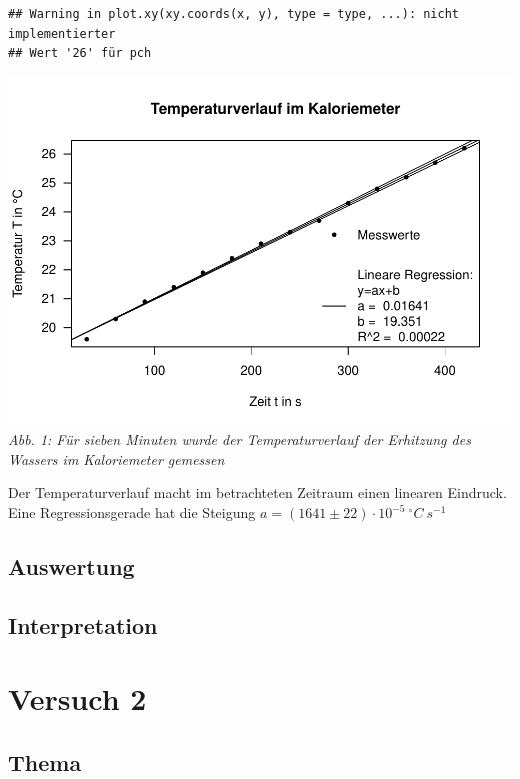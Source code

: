 \documentclass[
  9pt,
]{article}
\begin{document}
\begin{verbatim}
## Warning in plot.xy(xy.coords(x, y), type = type, ...): nicht implementierter
## Wert '26' für pch
\end{verbatim}

\includegraphics{Kaloriemeter_files/figure-latex/unnamed-chunk-1-1.pdf}
\emph{Abb. 1: Für sieben Minuten wurde der Temperaturverlauf der
Erhitzung des Wassers im Kaloriemeter gemessen}

Der Temperaturverlauf macht im betrachteten Zeitraum einen linearen
Eindruck. Eine Regressionsgerade hat die Steigung
\(a=(1641\pm 22)\cdot 10^{-5}\ ^{\circ} C\ s^{-1}\)

\hypertarget{auswertung}{%
\subsection{Auswertung}\label{auswertung}}

\hypertarget{interpretation}{%
\subsection{Interpretation}\label{interpretation}}

\hypertarget{versuch-2}{%
\section{Versuch 2}\label{versuch-2}}

\hypertarget{thema-1}{%
\subsection{Thema}\label{thema-1}}
\end{document}
